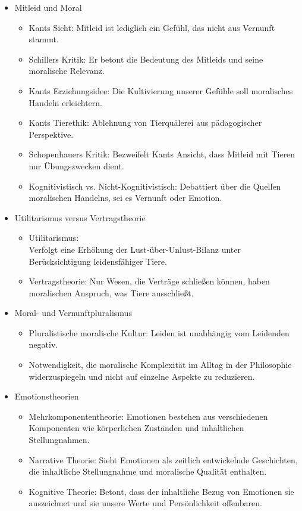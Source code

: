 \documentclass{article}
\begin{document}
\begin{itemize}

	\item Mitleid und Moral
	      \begin{itemize}
		      \item Kants Sicht: Mitleid ist lediglich ein Gefühl, das nicht aus Vernunft stammt.
		      \item Schillers Kritik: Er betont die Bedeutung des Mitleids und seine moralische Relevanz.
		      \item Kants Erziehungsidee: Die Kultivierung unserer Gefühle soll moralisches Handeln erleichtern.
		      \item Kants Tierethik: Ablehnung von Tierquälerei aus pädagogischer Perspektive.
		      \item Schopenhauers Kritik: Bezweifelt Kants Ansicht, dass Mitleid mit Tieren nur Übungszwecken dient.
		      \item Kognitivistisch vs. Nicht-Kognitivistisch: Debattiert über die Quellen moralischen Handelns, sei es Vernunft oder Emotion.
	      \end{itemize}
	\item Utilitarismus versus Vertragstheorie
	      \begin{itemize}
		      \item Utilitarismus: \\Verfolgt eine Erhöhung der Lust-über-Unlust-Bilanz unter Berücksichtigung leidensfähiger Tiere.
		      \item Vertragstheorie: Nur Wesen, die Verträge schließen können, haben moralischen Anspruch, was Tiere ausschließt.
	      \end{itemize}

	\item Moral- und Vernunftpluralismus
	      \begin{itemize}
		      \item Pluralistische moralische Kultur: Leiden ist unabhängig vom Leidenden negativ.
		      \item Notwendigkeit, die moralische Komplexität im Alltag in der Philosophie widerzuspiegeln und nicht auf einzelne Aspekte zu reduzieren.
	      \end{itemize}

	\item Emotionstheorien
	      \begin{itemize}
		      \item Mehrkomponententheorie: Emotionen bestehen aus verschiedenen Komponenten wie körperlichen Zuständen und inhaltlichen Stellungnahmen.
		      \item Narrative Theorie: Sieht Emotionen als zeitlich entwickelnde Geschichten, die inhaltliche Stellungnahme und moralische Qualität enthalten.
		      \item Kognitive Theorie: Betont, dass der inhaltliche Bezug von Emotionen sie auszeichnet und sie unsere Werte und Persönlichkeit offenbaren.
	      \end{itemize}


\end{itemize}
\end{document}
